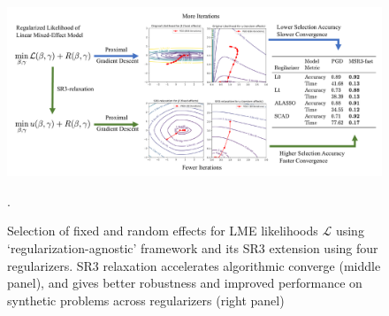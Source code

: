 \begin{figure}[h!]
    \centering
    \includegraphics[width=\textwidth]{figures/summary_picture.pdf}
    \caption{Selection of fixed and random effects for LME likelihoods $\mathcal{L}$ using 
    `regularization-agnostic' framework and its SR3 extension using four regularizers. 
    SR3 relaxation accelerates algorithmic converge  (middle panel), and gives better robustness and improved performance on synthetic problems across regularizers (right panel)}.
    \label{fig:summary}
\end{figure}

